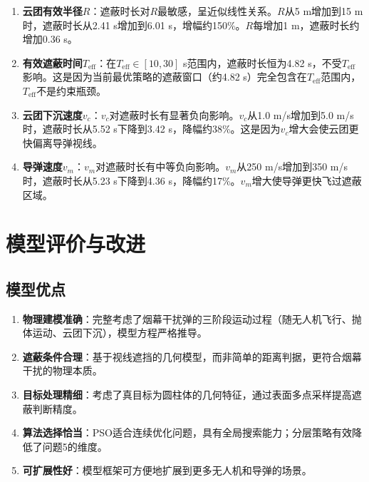 \documentclass[12pt,a4paper]{article}
\begin{document}
\begin{enumerate}
    \item \textbf{云团有效半径$R$}：遮蔽时长对$R$最敏感，呈近似线性关系。$R$从5 m增加到15 m时，遮蔽时长从2.41 s增加到6.01 s，增幅约150\%。$R$每增加1 m，遮蔽时长约增加0.36 s。

    \item \textbf{有效遮蔽时间$T_{\text{eff}}$}：在$T_{\text{eff}} \in [10, 30]$ s范围内，遮蔽时长恒为4.82 s，不受$T_{\text{eff}}$影响。这是因为当前最优策略的遮蔽窗口（约4.82 s）完全包含在$T_{\text{eff}}$范围内，$T_{\text{eff}}$不是约束瓶颈。

    \item \textbf{云团下沉速度$v_c$}：$v_c$对遮蔽时长有显著负向影响。$v_c$从1.0 m/s增加到5.0 m/s时，遮蔽时长从5.52 s下降到3.42 s，降幅约38\%。这是因为$v_c$增大会使云团更快偏离导弹视线。

    \item \textbf{导弹速度$v_m$}：$v_m$对遮蔽时长有中等负向影响。$v_m$从250 m/s增加到350 m/s时，遮蔽时长从5.23 s下降到4.36 s，降幅约17\%。$v_m$增大使导弹更快飞过遮蔽区域。
\end{enumerate}


\section{模型评价与改进}

\subsection{模型优点}

\begin{enumerate}
    \item \textbf{物理建模准确}：完整考虑了烟幕干扰弹的三阶段运动过程（随无人机飞行、抛体运动、云团下沉），模型方程严格推导。

    \item \textbf{遮蔽条件合理}：基于视线遮挡的几何模型，而非简单的距离判据，更符合烟幕干扰的物理本质。

    \item \textbf{目标处理精细}：考虑了真目标为圆柱体的几何特征，通过表面多点采样提高遮蔽判断精度。

    \item \textbf{算法选择恰当}：PSO适合连续优化问题，具有全局搜索能力；分层策略有效降低了问题5的维度。

    \item \textbf{可扩展性好}：模型框架可方便地扩展到更多无人机和导弹的场景。
\end{enumerate}
\end{document}
